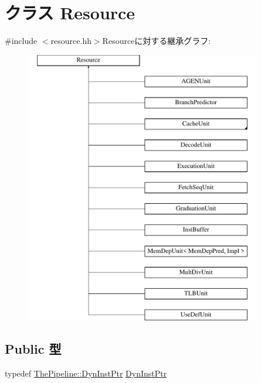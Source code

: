 \hypertarget{classResource}{
\section{クラス Resource}
\label{classResource}
}


{\ttfamily \#include $<$resource.hh$>$}Resourceに対する継承グラフ:\begin{figure}[H]
\begin{center}
\leavevmode
\includegraphics[height=12cm]{classResource}
\end{center}
\end{figure}
\subsection*{Public 型}
\begin{DoxyCompactItemize}
\item 
typedef \hyperlink{classRefCountingPtr}{ThePipeline::DynInstPtr} \hyperlink{classResource_af9d0c8a46736ba6aa2d8bb94da1a5e73}{DynInstPtr}
\end{DoxyCompactItemize}
